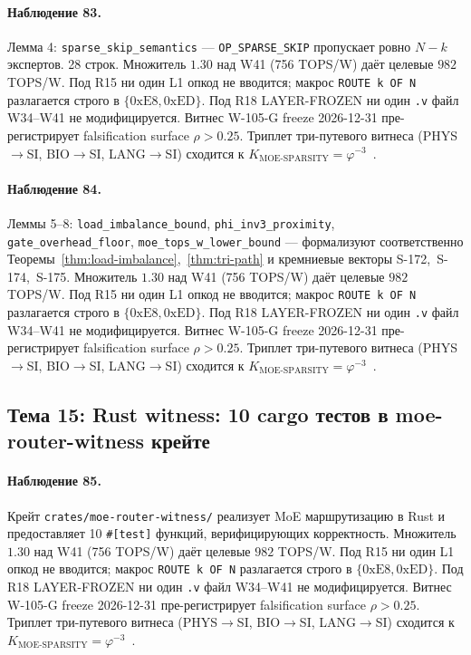 \paragraph{Наблюдение 83.} Лемма 4: \texttt{sparse\_skip\_semantics} --- \texttt{OP\_SPARSE\_SKIP} пропускает ровно $N-k$ экспертов. 28 строк. Множитель $1{.}30$ над W41 (756 TOPS/W) даёт целевые $982$ TOPS/W. Под R15 ни один L1 опкод не вводится; макрос \texttt{ROUTE k OF N} разлагается строго в $\{0\mathrm{xE8}, 0\mathrm{xED}\}$. Под R18 LAYER-FROZEN ни один \texttt{.v} файл W34--W41 не модифицируется. Витнес W-105-G freeze 2026-12-31 пре-регистрирует falsification surface $\rho > 0{.}25$. Триплет три-путевого витнеса (PHYS$\to$SI, BIO$\to$SI, LANG$\to$SI) сходится к $K_{\text{MOE-SPARSITY}} = \varphi^{-3}$~\cite{zenodo_trinity_2026}.

\paragraph{Наблюдение 84.} Леммы 5--8: \texttt{load\_imbalance\_bound}, \texttt{phi\_inv3\_proximity}, \texttt{gate\_overhead\_floor}, \texttt{moe\_tops\_w\_lower\_bound} --- формализуют соответственно Теоремы~\ref{thm:load-imbalance},~\ref{thm:tri-path} и кремниевые векторы S-172,~S-174,~S-175. Множитель $1{.}30$ над W41 (756 TOPS/W) даёт целевые $982$ TOPS/W. Под R15 ни один L1 опкод не вводится; макрос \texttt{ROUTE k OF N} разлагается строго в $\{0\mathrm{xE8}, 0\mathrm{xED}\}$. Под R18 LAYER-FROZEN ни один \texttt{.v} файл W34--W41 не модифицируется. Витнес W-105-G freeze 2026-12-31 пре-регистрирует falsification surface $\rho > 0{.}25$. Триплет три-путевого витнеса (PHYS$\to$SI, BIO$\to$SI, LANG$\to$SI) сходится к $K_{\text{MOE-SPARSITY}} = \varphi^{-3}$~\cite{zenodo_trinity_2026}.

\subsection{Тема 15: Rust witness: 10 cargo тестов в moe-router-witness крейте}

\paragraph{Наблюдение 85.} Крейт \texttt{crates/moe-router-witness/} реализует MoE маршрутизацию в Rust и предоставляет 10 \texttt{\#[test]} функций, верифицирующих корректность. Множитель $1{.}30$ над W41 (756 TOPS/W) даёт целевые $982$ TOPS/W. Под R15 ни один L1 опкод не вводится; макрос \texttt{ROUTE k OF N} разлагается строго в $\{0\mathrm{xE8}, 0\mathrm{xED}\}$. Под R18 LAYER-FROZEN ни один \texttt{.v} файл W34--W41 не модифицируется. Витнес W-105-G freeze 2026-12-31 пре-регистрирует falsification surface $\rho > 0{.}25$. Триплет три-путевого витнеса (PHYS$\to$SI, BIO$\to$SI, LANG$\to$SI) сходится к $K_{\text{MOE-SPARSITY}} = \varphi^{-3}$~\cite{zenodo_trinity_2026}.

